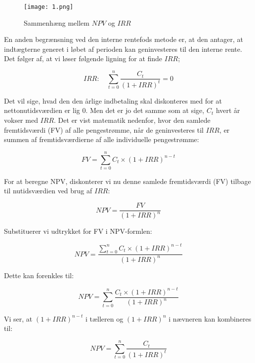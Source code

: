 \documentclass[10pt,reqno, usenames]{article}
\begin{document}
\begin{figure}[h]
     \centering
     \texttt{[image: 1.png]}
     \caption{Sammenhæng mellem $NPV$ og $IRR$}
     \label{Figur 2}
\end{figure} 

En anden begrænsning ved den interne rentefods metode er, at den antager, at indtægterne generet i løbet af perioden kan geninvesteres til den interne rente. Det følger af, at vi løser følgende ligning for at finde $IRR$; 

\begin{equation}
    IRR: \quad \sum_{t=0}^{n} \frac{C_t}{(1 + IRR)^t} = 0
\end{equation}

Det vil sige, hvad den den årlige indbetaling skal diskonteres med for at nettonutidsværdien er lig 0. Men det er jo det samme som at sige, $C_t$ hvert år vokser med $IRR$. Det er vist matematik nedenfor, hvor den samlede fremtidsværdi (FV) af alle pengestrømme, når de geninvesteres til $IRR$, er summen af fremtidsværdierne af alle individuelle pengestrømme:

\begin{equation*}
FV = \sum_{t=0}^{n} C_t \times (1 + IRR)^{n-t}
\end{equation*}

For at beregne NPV, diskonterer vi nu denne samlede fremtidsværdi (FV) tilbage til nutidsværdien ved brug af $IRR$:

\begin{equation*}
NPV = \frac{FV}{(1 + IRR)^n}
\end{equation*}

Substituerer vi udtrykket for FV i NPV-formlen:

\begin{equation*}
NPV = \frac{\sum_{t=0}^{n} C_t \times (1 + IRR)^{n-t}}{(1 + IRR)^n}
\end{equation*}

Dette kan forenkles til:

\begin{equation*}
NPV = \sum_{t=0}^{n} \frac{C_t \times (1 + IRR)^{n-t}}{(1 + IRR)^n}
\end{equation*}

Vi ser, at \( (1 + IRR)^{n-t} \) i tælleren og \( (1 + IRR)^n \) i nævneren kan kombineres til:

\begin{equation*}
NPV = \sum_{t=0}^{n} \frac{C_t}{(1 + IRR)^t}
\end{equation*}
\end{document}
